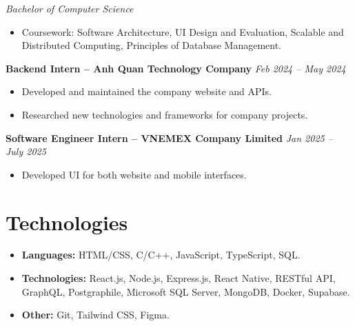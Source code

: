 \documentclass[10pt,a4paper]{article}
\begin{document}
\vspace{0.2cm}

\textit{Bachelor of Computer Science}

\begin{itemize}[leftmargin=*]
    \item Coursework: Software Architecture, UI Design and Evaluation, Scalable and Distributed Computing, Principles of Database Management.
\end{itemize}

\vspace{0.2cm}

\noindent
\textbf{Backend Intern -- Anh Quan Technology Company}
\hfill \textit{Feb 2024 -- May 2024}

\begin{itemize}[leftmargin=*]
    \item Developed and maintained the company website and APIs.
    \item Researched new technologies and frameworks for company projects.
\end{itemize}

\vspace{0.2cm}

\noindent
\textbf{Software Engineer Intern -- VNEMEX Company Limited}
\hfill \textit{Jan 2025 -- July 2025}

\begin{itemize}[leftmargin=*]
    \item Developed UI for both website and mobile interfaces.
\end{itemize}


\section*{Technologies}

\begin{itemize}[leftmargin=*]
    \item \textbf{Languages:} HTML/CSS, C/C++, JavaScript, TypeScript, SQL.
    
    \item \textbf{Technologies:} React.js, Node.js, Express.js, React Native, RESTful API, GraphQL, Postgraphile, Microsoft SQL Server, MongoDB, Docker, Supabase.
    
    \item \textbf{Other:} Git, Tailwind CSS, Figma.
\end{itemize}
\end{document}
